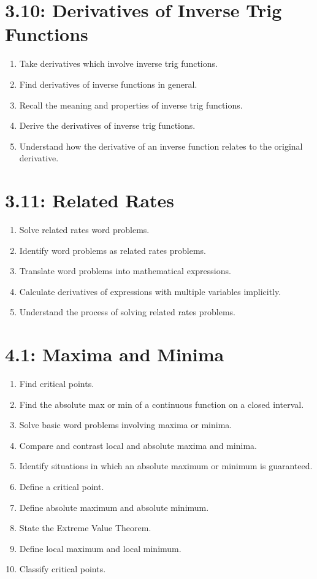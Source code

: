 \documentclass[11pt]{article}
\begin{document}
\section*{3.10: Derivatives of Inverse Trig Functions}
\begin{enumerate}
	\item Take derivatives which involve inverse trig functions.
	\item Find derivatives of inverse functions in general.
	\item Recall the meaning and properties of inverse trig functions.
	\item Derive the derivatives of inverse trig functions.
	\item Understand how the derivative of an inverse function relates to the original derivative.
\end{enumerate}

\section*{3.11: Related Rates}
\begin{enumerate}
	\item Solve related rates word problems.
	\item Identify word problems as related rates problems.
	\item Translate word problems into mathematical expressions.
	\item Calculate derivatives of expressions with multiple variables implicitly.
	\item Understand the process of solving related rates problems.
\end{enumerate}

\section*{4.1: Maxima and Minima}
\begin{enumerate}
	\item Find critical points.
	\item Find the absolute max or min of a continuous function on a closed interval.
	\item Solve basic word problems involving maxima or minima.
	\item Compare and contrast local and absolute maxima and minima.
	\item Identify situations in which an absolute maximum or minimum is guaranteed.
	\item Define a critical point.
	\item Define absolute maximum and absolute minimum.
	\item State the Extreme Value Theorem.
	\item Define local maximum and local minimum.
	\item Classify critical points.
\end{enumerate}
\end{document}
